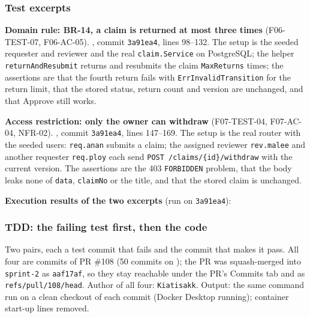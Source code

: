 \subsubsection*{Test excerpts}

\textbf{Domain rule: BR-14, a claim is returned at most three times} (F06-TEST-07, F06-AC-05).
, commit \texttt{3a91ea4}, lines 98--132.
The setup is the seeded requester and reviewer and the real \texttt{claim.Service} on PostgreSQL; the helper \texttt{returnAndResubmit} returns and resubmits the claim \texttt{MaxReturns} times; the assertions are that the fourth return fails with \texttt{ErrInvalidTransition} for the return limit, that the stored status, return count and version are unchanged, and that Approve still works.


\textbf{Access restriction: only the owner can withdraw} (F07-TEST-04, F07-AC-04, NFR-02).
, commit \texttt{3a91ea4}, lines 147--169.
The setup is the real router with the seeded users: \texttt{req.anan} submits a claim; the assigned reviewer \texttt{rev.malee} and another requester \texttt{req.ploy} each send \texttt{POST /claims/\{id\}/withdraw} with the current version. The assertions are the 403 \texttt{FORBIDDEN} problem, that the body leaks none of \texttt{data}, \texttt{claimNo} or the title, and that the stored claim is unchanged.


\textbf{Execution results of the two excerpts} (run on \texttt{3a91ea4}):


\subsubsection*{TDD: the failing test first, then the code}

Two pairs, each a test commit that fails and the commit that makes it pass. All four are commits of PR \#108 (50 commits on ); the PR was squash-merged into \texttt{sprint-2} as \texttt{aaf17af}, so they stay reachable under the PR's Commits tab and as \texttt{refs/pull/108/head}. Author of all four: \texttt{Kiatisakk}. Output: the same command run on a clean checkout of each commit (Docker Desktop running); container start-up lines removed.

